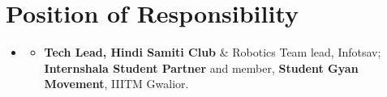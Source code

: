 \documentclass[letterpaper,11pt]{article}
\newcommand{\resumeItem}[1]{
  \item\small{
    {#1 \vspace{-2pt}} %
  }
}
\newcommand{\resumeSubHeadingListStart}{\begin{itemize}[leftmargin=0.0in, label={}]}
\newcommand{\resumeSubHeadingListEnd}{\end{itemize}}
\newcommand{\resumeItemListStart}{\begin{itemize}}
\newcommand{\resumeItemListEnd}{\end{itemize}\vspace{-5pt}}
\begin{document}
\section{Position of Responsibility}
    \resumeSubHeadingListStart
        \item[]
        \resumeItemListStart
            \resumeItem{{\textbf{Tech Lead, Hindi Samiti Club}} \& Robotics Team lead, Infotsav; {\textbf{Internshala Student Partner}} and member, {\textbf{Student Gyan Movement}}, IIITM Gwalior.}
        \resumeItemListEnd
    \resumeSubHeadingListEnd
\end{document}
